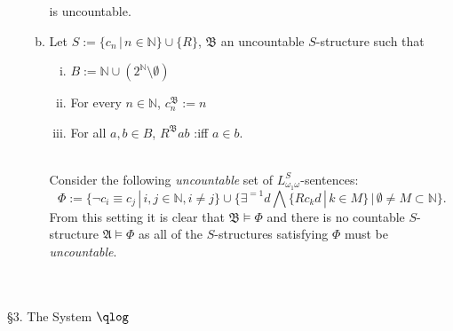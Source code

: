 \begin{enumerate}[1.]
\begin{enumerate}[(a)]
\[\]
is uncountable.
\item Let $S := \{ c_n \, | \, n \in \mathbb{N} \} \cup \{ R \}$, $\mathfrak{B}$ an uncountable $S$-structure such that
\begin{enumerate}[(i)]
\item $B := \mathbb{N} \cup (2^\mathbb{N} \setminus \emptyset)$
\item For every $n \in \mathbb{N}$, $c_n^\mathfrak{B} := n$
\item For all $a, b \in B$, $R^\mathfrak{B}ab$ :iff $a \in b$.
\end{enumerate}\ 
\\
Consider the following \emph{uncountable} set of $L^S_{\omega_1\omega}$-sentences:
\[
\Phi := \{ \neg c_i \equiv c_j \, | \, i, j \in \mathbb{N}, i \neq j \} \cup \{ \exists^{=1} d \bigwedge \{ Rc_kd \, | \, k \in M \} \, | \, \emptyset \neq M \subset \mathbb{N} \}.
\]
From this setting it is clear that $\mathfrak{B} \models \Phi$ and there is no countable $S$-structure $\mathfrak{A} \models \Phi$ as all of the $S$-structures satisfying $\Phi$ must be \emph{uncountable}.
\end{enumerate}
\end{enumerate}
\
\\
\\
{\large \S3. The System $\qlog$}
